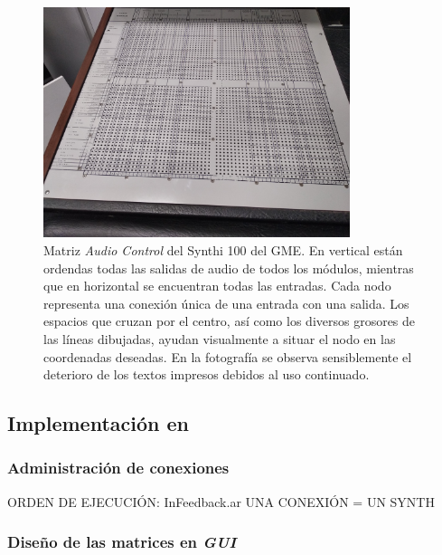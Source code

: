 \begin{figure}
	\centering
	\includegraphics[width=0.8\textwidth]{images/patchbay_audio_vista_gral}
	\caption[Matriz \textit{Audio Control} del Synthi 100 del GME]{Matriz \textit{Audio Control} del Synthi 100 del GME. En vertical están ordendas todas las salidas de audio de todos los módulos, mientras que en horizontal se encuentran todas las entradas. Cada nodo representa una conexión única de una entrada con una salida. Los espacios que cruzan por el centro, así como los diversos grosores de las líneas dibujadas, ayudan visualmente a situar el nodo en las coordenadas deseadas. En la fotografía se observa sensiblemente el deterioro de los textos impresos debidos al uso continuado.}
	\label{fig:patchbay_audio_vista_gral}
\end{figure}

\subsection{Implementación en \appName}

\subsubsection[]{Administración de conexiones}
ORDEN DE EJECUCIÓN: InFeedback.ar
UNA CONEXIÓN = UN SYNTH

\subsubsection[]{Diseño de las matrices en \textit{GUI}}